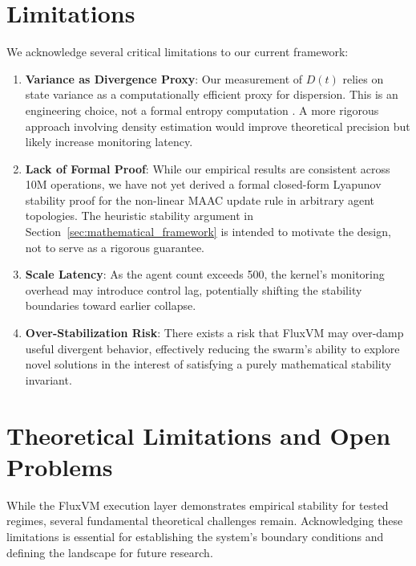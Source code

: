 \documentclass{article}
\begin{document}
\section{Limitations}
\label{sec:limitations}
We acknowledge several critical limitations to our current framework:
\begin{enumerate}
    \item \textbf{Variance as Divergence Proxy}: Our measurement of $D(t)$ relies on state variance as a computationally efficient proxy for dispersion. This is an engineering choice, not a formal entropy computation \cite{cover1999elements}. A more rigorous approach involving density estimation would improve theoretical precision but likely increase monitoring latency.
    \item \textbf{Lack of Formal Proof}: While our empirical results are consistent across 10M operations, we have not yet derived a formal closed-form Lyapunov stability proof for the non-linear MAAC update rule in arbitrary agent topologies. The heuristic stability argument in Section~\ref{sec:mathematical_framework} is intended to motivate the design, not to serve as a rigorous guarantee.
    \item \textbf{Scale Latency}: As the agent count exceeds 500, the kernel's monitoring overhead may introduce control lag, potentially shifting the stability boundaries toward earlier collapse.
    \item \textbf{Over-Stabilization Risk}: There exists a risk that FluxVM may over-damp useful divergent behavior, effectively reducing the swarm's ability to explore novel solutions in the interest of satisfying a purely mathematical stability invariant.
\end{enumerate}

\newpage

\section{Theoretical Limitations and Open Problems}
\label{sec:limitations_extended}

While the FluxVM execution layer demonstrates empirical stability for tested regimes, several fundamental theoretical challenges remain. Acknowledging these limitations is essential for establishing the system's boundary conditions and defining the landscape for future research.
\end{document}
